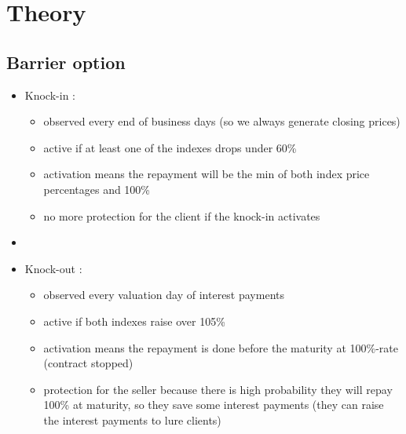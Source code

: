 \section{Theory}


\subsection{Barrier option}
\begin{frame}
\myframetitle{}
\begin{itemize}
	\item Knock-in :
	\begin{itemize}
		\item observed every end of business days (so we always generate closing prices)
		\item active if at least one of the indexes drops under 60\%
		\item activation means the repayment will be the min of both index price percentages and 100\%
		\item no more protection for the client if the knock-in activates
	\end{itemize}
	\item []
	\item Knock-out :
	\begin{itemize}
		\item observed every valuation day of interest payments
		\item active if both indexes raise over 105\%
		\item activation means the repayment is done before the maturity at 100\%-rate (contract stopped)
		\item protection for the seller because there is high probability they will repay 100\% at maturity, so they save some interest payments (they can raise the interest payments to lure clients)
	\end{itemize}
\end{itemize}
\end{frame}

